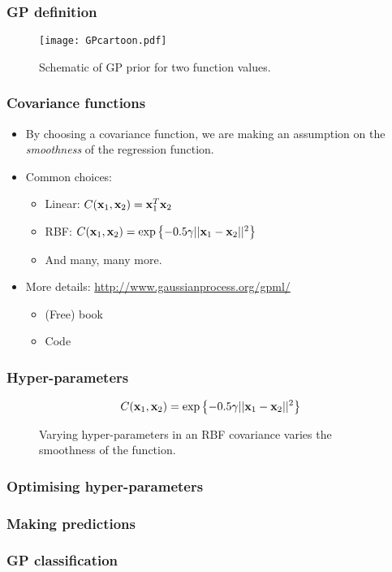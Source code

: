 \begin{frame}
	\frametitle{GP definition}
	\begin{figure}[tbh]
		\texttt{[image: GPcartoon.pdf]}		
		\centering\caption{\label{fig:GPcartoon}Schematic of GP prior for two function values.}
	\end{figure}
\end{frame}


\begin{frame}
	\frametitle{Covariance functions}
	\begin{itemize}
		\item By choosing a covariance function, we are making an assumption on the \emph{smoothness} of the regression function.
		\item Common choices:
		\begin{itemize}
			\item Linear: $C(\mathbf{x}_1,\mathbf{x}_2) = \mathbf{x}_1^T\mathbf{x}_2$
			\item RBF: $C(\mathbf{x}_1,\mathbf{x}_2) = \exp\left\{-0.5\gamma ||\mathbf{x}_1 - \mathbf{x}_2||^2 \right\}$
			\item And many, many more.
		\end{itemize}
		\item More details: \url{http://www.gaussianprocess.org/gpml/}
		\begin{itemize}
			\item (Free) book
			\item Code
		\end{itemize}
	\end{itemize}
\end{frame}

\begin{frame}
	\frametitle{Hyper-parameters}
	\[
C(\mathbf{x}_1,\mathbf{x}_2) = \exp\left\{-0.5\gamma ||\mathbf{x}_1 - \mathbf{x}_2||^2 \right\}
	\]
	\begin{figure}[tbh]
		\centering\caption{\label{fig:hyper}Varying hyper-parameters in an RBF covariance varies the smoothness of the function.}
	\end{figure}
\end{frame}

\begin{frame}
	\frametitle{Optimising hyper-parameters}
	
\end{frame}

\begin{frame}
	\frametitle{Making predictions}
	
\end{frame}

\begin{frame}
	\frametitle{GP classification}
	
\end{frame}
